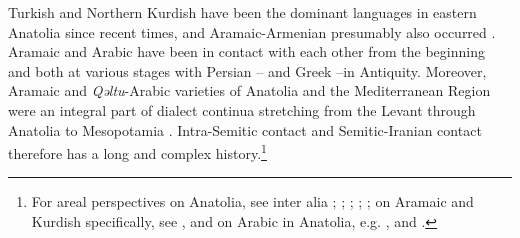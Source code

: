 \documentclass[output=paper,colorlinks,citecolor=brown,draftmode]{langscibook}
\begin{document}
Turkish  and Northern Kurdish  have been the dominant languages in eastern Anatolia since recent times, and Aramaic-Armenian  presumably also occurred \citep[3]{Jastrow1994Mlahso}. Aramaic and Arabic have been in contact with each other from the beginning and both at various stages with Persian – and Greek  –in Antiquity. Moreover, Aramaic and \textit{Qəltu}-Arabic varieties of Anatolia and the Mediterranean Region were an integral part of dialect continua stretching from the Levant through Anatolia to Mesopotamia \citep{Jastrow2007RomanoArabic}. Intra-Semitic contact and Semitic-Iranian contact therefore has a long and complex history.\footnote{For areal perspectives on Anatolia, see inter alia \citet{haig_linguistic_2001,Haig2014EALingArea,haig_western_2017}; \citet[270]{Matras2009LC}; \citet{HaigKhan2019LLWA}; \citet{Khan2019Anatolia}; \citet{DonabedianSitaridou2021LCAnatolia}; on Aramaic and Kurdish specifically, see \citet{Noorlander2014Diversity}, and on Arabic in Anatolia, e.g. \citet{Talay2007TKinfluenceA}, \citet{Prochazka2020AIST} and \citet{Akkus2020AA}.}
\end{document}
